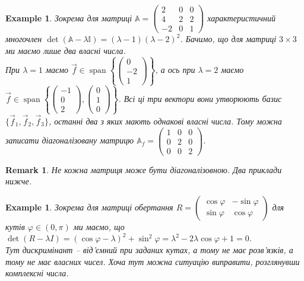 \documentclass[a4paper, 10pt]{article}
\theoremstyle{theoremdd}
\newtheorem{example}[theorem]{Example}
\newtheorem{remark}[theorem]{Remark}
\DeclareMathOperator{\linspan}{span}
\begin{document}
\begin{example}
Зокрема для матриці $\mathbb{A} = \begin{pmatrix}
2 & 0 & 0 \\
4 & 2 & 2 \\
-2 & 0 & 1
\end{pmatrix}$ характеристичний многочлен $\det (\mathbb{A}-\lambda \mathbb{I}) = (\lambda-1)(\lambda-2)^2$. Бачимо, що для матриці $3 \times 3$ ми маємо лише два власні числа.\\
При $\lambda = 1$ маємо $\vec{f} \in \linspan \left\{ \begin{pmatrix}
0 \\ -2 \\ 1
\end{pmatrix} \right\}$, а ось при $\lambda = 2$ маємо $\vec{f} \in \linspan \left\{ \begin{pmatrix}
-1 \\ 0 \\ 2
\end{pmatrix}, \begin{pmatrix}
0 \\ 1 \\ 0
\end{pmatrix} \right\}$. Всі ці три вектори вони утворюють базис $\{\vec{f}_1,\vec{f}_2,\vec{f}_3 \}$, останні два з яких мають однакові власні числа. Тому можна записати діагоналізовану матрицю $\mathbb{A}_f = \begin{pmatrix}
1 & 0 & 0 \\
0 & 2 & 0 \\
0 & 0 & 2
\end{pmatrix}$.
\end{example}

\begin{remark}
Не кожна матриця може бути діагоналізовною. Два приклади нижче.
\end{remark}

\begin{example}
Зокрема для матриці обертання $R = \begin{pmatrix}
\cos \varphi & -\sin \varphi \\
\sin \varphi & \cos \varphi
\end{pmatrix}$ для кутів $\varphi \in (0,\pi)$ ми маємо, що $\det (R - \lambda I) = (\cos \varphi-\lambda)^2 + \sin^2 \varphi = \lambda^2 - 2\lambda \cos \varphi + 1 = 0$.\\
Тут дискримінант -- від'ємний при заданих кутах, а тому не має розв'язків, а тому не має власних чисел. Хоча тут можна ситуацію виправити, розглянувши комплексні числа.
\end{example}
\end{document}

